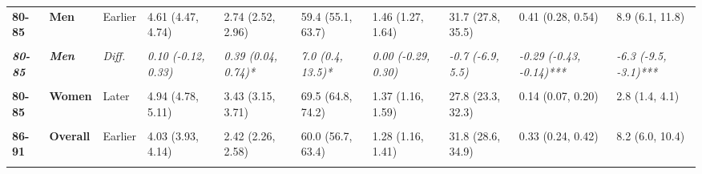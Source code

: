 \begin{table}[!h]
{{\begin{tabular}[t]{>{}l>{}lllllllll}
\cmidrule{1-10}
\textbf{80-85} & \textbf{Men} & Earlier & 4.61 (4.47, 4.74) & 2.74 (2.52, 2.96) & 59.4 (55.1, 63.7) & 1.46 (1.27, 1.64) & 31.7 (27.8, 35.5) & 0.41 (0.28, 0.54) & 8.9 (6.1, 11.8)\\
\cmidrule{1-10}
\textbf{\cellcolor{gray!10}{80-85}} & \textbf{\cellcolor{gray!10}{Men}} & \cellcolor{gray!10}{Later} & \cellcolor{gray!10}{4.71 (4.53, 4.90)} & \cellcolor{gray!10}{3.13 (2.86, 3.40)} & \cellcolor{gray!10}{66.4 (61.4, 71.3)} & \cellcolor{gray!10}{1.46 (1.23, 1.69)} & \cellcolor{gray!10}{31.0 (26.1, 35.8)} & \cellcolor{gray!10}{0.12 (0.05, 0.20)} & \cellcolor{gray!10}{2.6 (1.1, 4.2)}\\
\cmidrule{1-10}
\em{\textbf{80-85}} & \em{\textbf{Men}} & \em{Diff.} & \em{0.10 (-0.12, 0.33)} & \em{0.39 (0.04, 0.74)*} & \em{7.0 (0.4, 13.5)*} & \em{0.00 (-0.29, 0.30)} & \em{-0.7 (-6.9, 5.5)} & \em{-0.29 (-0.43, -0.14)***} & \em{-6.3 (-9.5, -3.1)***}\\
\cmidrule{1-10}
\textbf{\cellcolor{gray!10}{80-85}} & \textbf{\cellcolor{gray!10}{Women}} & \cellcolor{gray!10}{Earlier} & \cellcolor{gray!10}{4.85 (4.71, 5.00)} & \cellcolor{gray!10}{2.76 (2.54, 2.99)} & \cellcolor{gray!10}{57.0 (52.5, 61.4)} & \cellcolor{gray!10}{1.53 (1.33, 1.73)} & \cellcolor{gray!10}{31.5 (27.5, 35.4)} & \cellcolor{gray!10}{0.56 (0.44, 0.69)} & \cellcolor{gray!10}{11.6 (9.0, 14.2)}\\
\cmidrule{1-10}
\textbf{80-85} & \textbf{Women} & Later & 4.94 (4.78, 5.11) & 3.43 (3.15, 3.71) & 69.5 (64.8, 74.2) & 1.37 (1.16, 1.59) & 27.8 (23.3, 32.3) & 0.14 (0.07, 0.20) & 2.8 (1.4, 4.1)\\
\cmidrule{1-10}
\em{\textbf{\cellcolor{gray!10}{80-85}}} & \em{\textbf{\cellcolor{gray!10}{Women}}} & \em{\cellcolor{gray!10}{Diff.}} & \em{\cellcolor{gray!10}{0.09 (-0.13, 0.31)}} & \em{\cellcolor{gray!10}{0.67 (0.31, 1.03)***}} & \em{\cellcolor{gray!10}{12.5 (6.1, 19.0)***}} & \em{\cellcolor{gray!10}{-0.15 (-0.45, 0.14)}} & \em{\cellcolor{gray!10}{-3.7 (-9.7, 2.3)}} & \em{\cellcolor{gray!10}{-0.43 (-0.57, -0.29)***}} & \em{\cellcolor{gray!10}{-8.8 (-11.8, -5.9)***}}\\
\cmidrule{1-10}
\textbf{86-91} & \textbf{Overall} & Earlier & 4.03 (3.93, 4.14) & 2.42 (2.26, 2.58) & 60.0 (56.7, 63.4) & 1.28 (1.16, 1.41) & 31.8 (28.6, 34.9) & 0.33 (0.24, 0.42) & 8.2 (6.0, 10.4)\\
\cmidrule{1-10}
\textbf{\cellcolor{gray!10}{86-91}} & \textbf{\cellcolor{gray!10}{Overall}} & \cellcolor{gray!10}{Later} & \cellcolor{gray!10}{4.25 (4.12, 4.38)} & \cellcolor{gray!10}{2.91 (2.71, 3.11)} & \cellcolor{gray!10}{68.4 (64.5, 72.3)} & \cellcolor{gray!10}{1.15 (0.99, 1.30)} & \cellcolor{gray!10}{27.0 (23.3, 30.7)} & \cellcolor{gray!10}{0.19 (0.13, 0.26)} & \cellcolor{gray!10}{4.6 (3.0, 6.1)}\\

\end{tabular}}}
\end{table}
